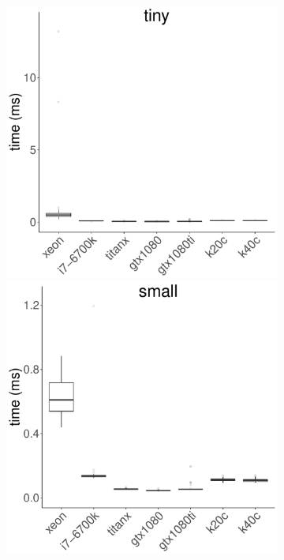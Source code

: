 \documentclass[../document.tex]{subfiles}
\begin{document}
\begin{figure}[t]
	\begin{subfigure}{0.09\textwidth} \label{fig:time-srad} \vspace{5mm}\end{subfigure}
	\begin{subfigure}{0.9\textwidth}
		\includegraphics[width=\plotwidth]{figures/time-results/generate_srad_tiny_boxplot-1}
		\includegraphics[width=\plotwidth]{figures/time-results/generate_srad_small_boxplot-1}

\end{subfigure}
\end{figure}
\end{document}
